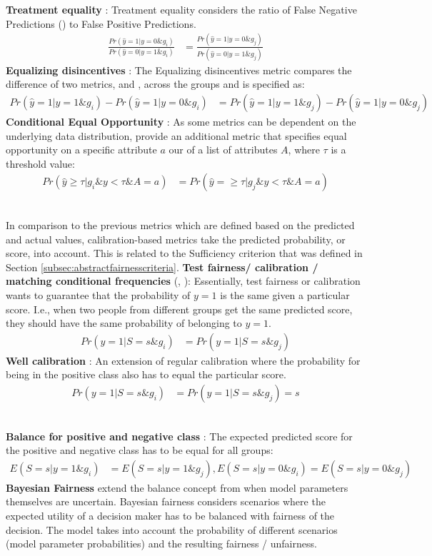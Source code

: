\textbf{Treatment equality} : Treatment equality considers the ratio of False Negative Predictions (\fnr) to False Positive Predictions. 
\begin{align}
  \frac{Pr(\hat{y}=1 |y=0 \& g_i)}{Pr(\hat{y}=0 |y=1 \& g_i)} &= \frac{Pr(\hat{y}=1 |y=0 \& g_j)}{Pr(\hat{y}=0 |y=1 \& g_j)}
\end{align}
\textbf{Equalizing disincentives} : The Equalizing disincentives metric compares the difference of two metrics, \tpr and \fpr, across the groups and is specified as:
\begin{align}
   Pr(\hat{y}=1 |y=1 \& g_i) - Pr(\hat{y}=1 |y=0 \& g_i) &= Pr(\hat{y}=1 |y=1 \& g_j) - Pr(\hat{y}=1 |y=0 \& g_j)
\end{align}
\textbf{Conditional Equal Opportunity} : As some metrics can be dependent on the underlying data distribution,  provide an additional metric that specifies equal opportunity on a specific attribute $a$ our of a list of attributes $A$, where $\tau$ is a threshold value:
\begin{align}
   Pr(\hat{y}\geq \tau |g_i \& y<\tau \& A=a) &= Pr(\hat{y}= \geq \tau | g_j \& y<\tau \& A=a)
\end{align}

\hfill\\
In comparison to the previous metrics which are defined based on the predicted and actual values, 
calibration-based metrics take the predicted probability, or score, into account. This is related to the Sufficiency criterion that was defined in Section \ref{subsec:abstractfairnesscriteria}.
\textbf{Test fairness/ calibration / matching conditional frequencies} (, ): Essentially, test fairness or calibration wants to guarantee that the probability of $y=1$ is the same given a particular score. I.e., when two people from different groups get the same predicted score, they should have the same probability of belonging to $y=1$. 
\begin{align}
   Pr(y=1 | S=s \& g_i) &= Pr(y=1 | S=s \& g_j) 
\end{align}
\textbf{Well calibration} : An extension of regular calibration where the probability for being in the positive class also has to equal the particular score.
\begin{align}
   Pr(y=1 | S=s \& g_i) &= Pr(y=1 | S=s \& g_j) = s
\end{align}

\hfill\\
\textbf{Balance for positive and negative class} : The expected predicted score for the positive and negative class has to be equal for all groups:
\begin{align}
   E(S=s | y=1 \& g_i) &= E(S=s | y=1 \& g_j), E(S=s | y=0 \& g_i) = E(S=s | y=0 \& g_j)
\end{align}
\textbf{Bayesian Fairness}  extend the balance concept from  when model parameters themselves are uncertain. Bayesian fairness considers scenarios where the expected utility of a decision maker has to be balanced with fairness of the decision. The model takes into account the probability of different scenarios (model parameter probabilities) and the resulting fairness / unfairness.

